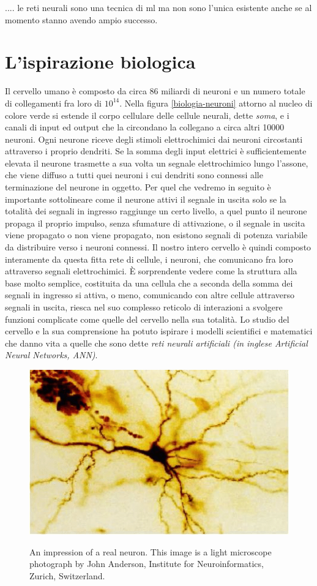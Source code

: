 .... le reti neurali sono una tecnica di ml ma non sono l'unica esistente anche se al momento stanno avendo ampio successo.

\section{L'ispirazione biologica}
Il cervello umano è composto da circa 86 miliardi di neuroni e un numero totale di collegamenti fra loro di $10^{14}$. Nella figura \ref{biologia-neuroni} attorno al nucleo di colore verde si estende il corpo cellulare delle cellule neurali, dette \textit{soma}, e i canali di input ed output che la circondano la collegano a circa altri 10000 neuroni.
Ogni neurone riceve degli stimoli elettrochimici dai neuroni circostanti attraverso i proprio dendriti. Se la somma degli input elettrici è sufficientemente elevata il neurone trasmette a sua volta un segnale elettrochimico lungo l'assone, che viene diffuso a tutti quei neuroni i cui dendriti sono connessi alle terminazione del neurone in oggetto.
Per quel che vedremo in seguito è importante sottolineare come il neurone attivi il segnale in uscita solo se la totalità dei segnali in ingresso raggiunge un certo livello, a quel punto il neurone propaga il proprio impulso, senza sfumature di attivazione, o il segnale in uscita viene propagato o non viene propagato, non esistono segnali di potenza variabile da distribuire verso i neuroni connessi.
Il nostro intero cervello è quindi composto interamente da questa fitta rete di cellule, i neuroni, che comunicano fra loro attraverso segnali elettrochimici. \`E sorprendente vedere come la struttura alla base molto semplice, costituita da una cellula che a seconda della somma dei segnali in ingresso si attiva, o meno, comunicando con altre cellule attraverso segnali in uscita, riesca nel suo complesso reticolo di interazioni a svolgere funzioni complicate come quelle del cervello nella sua totalità.
Lo studio del cervello e la sua comprensione ha potuto ispirare i modelli scientifici e matematici che danno vita a quelle che sono dette \textit{reti neurali artificiali (in inglese \textit{Artificial Neural Networks}, ANN)}.

\begin{figure}[t]
\centering
{\includegraphics[scale=0.65]{media_tesi/real_neuron.png}}
\caption{An impression of a real neuron. This image is a light microscope photograph by John Anderson, Institute for Neuroinformatics, Zurich, Switzerland.}
\label{fig:subfig}
\end{figure}

